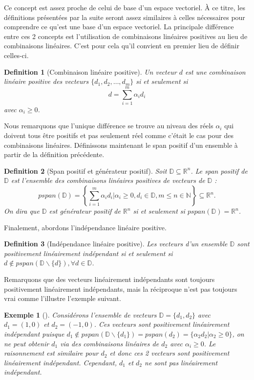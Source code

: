 \documentclass[french]{report}
\newtheorem{defn}{Definition}[section]
\newtheorem{exmp}{Exemple}[section]
\newcommand{\definition}[2]{\begin{defn}[#1] #2 \end{defn}}
\newcommand{\example}[2]{\begin{exmp}[#1] #2 \end{exmp}}
\begin{document}
Ce concept est assez proche de celui de base d'un espace vectoriel. À ce titre, les définitions présentées par la suite seront assez similaires à celles nécessaires pour comprendre ce qu'est une base d'un espace vectoriel.
La principale différence entre ces 2 concepts est l'utilisation de combinaisons linéaires positives au lieu de combinaisons linéaires. C'est pour cela qu'il convient en premier lieu de définir celles-ci.

\definition{Combinaison linéaire positive}
{
    Un vecteur $d$ est une combinaison linéaire positive des vecteurs $\{d_1,d_2,\dots,d_m\}$ si et seulement si
    $$
        d=\sum_{i=1}^m \alpha_i d_i
    $$
    avec $\alpha_i \geq 0$.
}

Nous remarquons que l'unique différence se trouve au niveau des réels $\alpha_i$ qui doivent tous être positifs et pas seulement réel comme c'était le cas pour des combinaisons linéaires. Définissons maintenant le span positif d'un ensemble à partir de la définition précédente.

\definition{Span positif et générateur positif}
{
    Soit $\mathbb{D} \subseteq \mathbb{R}^n$. Le span positif de $\mathbb{D}$ est l'ensemble des combinaisons linéaires positives de vecteurs de $\mathbb{D}$ :
    $$
        pspan(\mathbb{D}) = \left\{ \sum_{i=1}^m \alpha_i d_i | \alpha_i \geq 0, d_i\in\mathbb{D},m\leq n \in \mathbb{N}  \right\} \subseteq \mathbb{R}^n.
    $$
    On dira que $\mathbb{D}$ est générateur positif de $\mathbb{R}^n$ si et seulement si $pspan(\mathbb{D}) = \mathbb{R}^n$.
}

Finalement, abordons l'indépendance linéaire positive.

\definition{Indépendance linéaire positive}
{
    Les vecteurs d'un ensemble $\mathbb{D}$ sont positivement linéairement indépendant si et seulement si $d\not\in pspan(\mathbb{D}\backslash\{d\}), \forall d \in \mathbb{D}$. %
}


Remarquons que des vecteurs linéairement indépendants sont toujours positivement linéairement indépendants, mais la réciproque n'est pas toujours vrai comme l'illustre l'exemple suivant.
\example{}
{
    Considérons l'ensemble de vecteurs $\mathbb{D} = \{d_1,d_2\}$ avec $d_1 = (1,0)$ et $d_2 = (-1,0)$. Ces vecteurs sont positivement linéairement indépendant puisque $d_1\not\in pspan(\mathbb{D}\backslash\{d_1\})=pspan(d_2)= \{ \alpha_2 d_2 | \alpha_2 \geq 0 \} $, on ne peut obtenir $d_1$ via des combinaisons linéaires de $d_2$ avec $ \alpha_i \geq 0$. Le raisonnement est similaire pour $d_2$ et donc ces 2 vecteurs sont positivement linéairement indépendant. Cependant, $d_1$ et $d_2$ ne sont pas linéairement indépendant.
}
\end{document}

